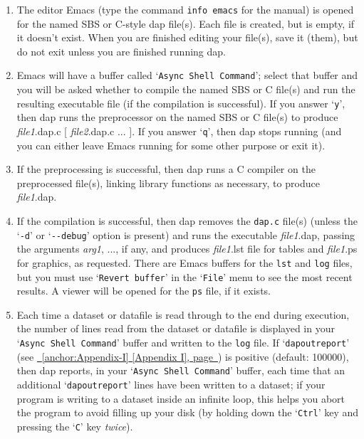 \documentclass{book}
\newcommand\Texinfocommandstyletextvar[1]{{\normalfont{}\textsl{#1}}}%
\renewcommand{\_}{\Texinfounderscore\discretionary{}{}{}}
\begin{document}
\begin{enumerate}[start=1]
\item The editor Emacs (type the command \texttt{info emacs}
for the manual) is opened for the named SBS or C-style dap file(s).
Each file is created, but is empty, if it doesn't exist.
When you are finished editing your file(s), save it (them), but do not
exit unless you are finished running dap.
\item Emacs will have a buffer called `\texttt{Async Shell Command}'; select that buffer
and you will be
asked whether to compile the named SBS or C file(s) and run the resulting
executable file (if the compilation is successful).
If you answer `\texttt{y}', then dap
runs the preprocessor on the named SBS or C file(s) to produce
\Texinfocommandstyletextvar{file1}.dap.c [ \Texinfocommandstyletextvar{file2}.dap.c ... ].
If you answer `\texttt{q}', then dap stops running (and you can either leave Emacs
running for some other purpose or exit it).

\item If the preprocessing is successful, 
then dap runs a C compiler on the preprocessed file(s), linking
library functions as necessary, to produce \Texinfocommandstyletextvar{file1}.dap.
\item If the compilation is successful, then dap removes the \texttt{dap.c} file(s)
(unless the `\texttt{-d}' or `\texttt{{-}{-}debug}' option is present) and
runs the executable \Texinfocommandstyletextvar{file1}.dap, passing the arguments
\Texinfocommandstyletextvar{arg1}, ..., if any, and produces \Texinfocommandstyletextvar{file1}.lst file for tables
%
%
and \Texinfocommandstyletextvar{file1}.ps for graphics, as requested.
%
%
There are Emacs buffers for
the \texttt{lst} and \texttt{log} files, but you must use
`\texttt{Revert buffer}'
%
in the `\texttt{File}' menu to see the most recent results.
A viewer will be opened for the \texttt{ps} file,
if it exists.

\item Each time a dataset or datafile is read through to the end
during execution, the number
of lines read from the dataset or datafile is displayed in your
`\texttt{Async Shell Command}' buffer and written to the \texttt{log} file.
If `\texttt{dap\_outreport}' (see \hyperref[anchor:Appendix-I]{\chaptername~\ref*{anchor:Appendix-I} [Appendix I], page~\pageref*{anchor:Appendix-I}}) is positive
(default: 100000), then dap reports, in your `\texttt{Async Shell Command}' buffer,
each time that an additional `\texttt{dap\_outreport}'
lines have been written to a dataset;
if your program is writing to a dataset inside an infinite loop,
this helps you abort the program to avoid filling up your disk
(by holding down the `\texttt{Ctrl}' key and pressing the `\texttt{C}' key \emph{twice}).
%


\end{enumerate}
\end{document}
